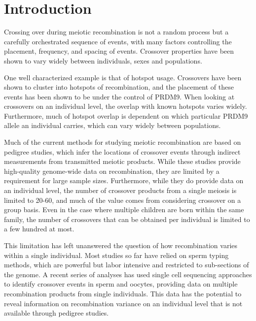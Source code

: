 

\section{Introduction}

Crossing over during meiotic recombination is not a random process but a carefully orchestrated sequence of events, with many factors controlling the placement, frequency, and spacing of events.
Crossover properties have been shown to vary widely between individuals, sexes and populations.

One well characterized example is that of hotspot usage.
Crossovers have been shown to cluster into hotspots of recombination\cite{Myers2005,hapmap2007}, and the placement of these events has been shown to be under the control of PRDM9\cite{Baudat2010,Myers2010,Parvanov2010}.
When looking at crossovers on an individual level, the overlap with known hotspots varies widely\cite{Coop2008}.
Furthermore, much of hotspot overlap is dependent on which particular PRDM9 allele an individual carries, which can vary widely between populations\cite{Baudat2010,Hinch2011}.

Much of the current methods for studying meiotic recombination are based on pedigree studies, which infer the locations of crossover events through indirect measurements from transmitted meiotic products.
While these studies provide high-quality genome-wide data on recombination, they are limited by a requirement for large sample sizes.
Furthermore, while they do provide data on an individual level, the number of crossover products from a single meiosis is limited to 20-60\cite{Lynn2004,Coop2008}, and much of the value comes from considering crossover on a group basis.
Even in the case where multiple children are born within the same family, the number of crossovers that can be obtained per individual is limited to a few hundred at most.

This limitation has left unanswered the question of how recombination varies within a single individual.
Most studies so far have relied on sperm typing methods, which are powerful but labor intensive and restricted to sub-sections of the genome\cite{Jeffreys2004}.
A recent series of analyses has used single cell sequencing approaches to identify crossover events in sperm\cite{Wang2012,Lu2012} and oocytes\cite{Hou2013}, providing data on multiple recombination products from single individuals.
This data has the potential to reveal information on recombination variance on an individual level that is not available through pedigree studies.

